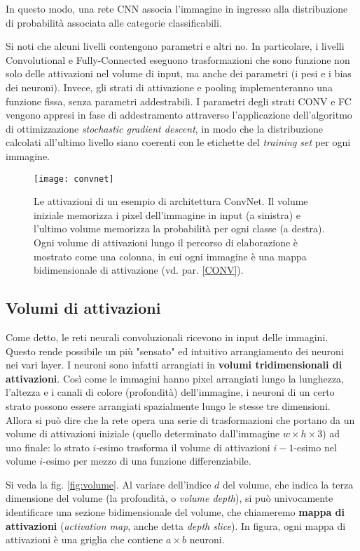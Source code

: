 In questo modo, una rete CNN associa l'immagine in ingresso alla distribuzione di probabilità associata alle categorie classificabili.

Si noti che alcuni livelli contengono parametri e altri no. In particolare, i livelli Convolutional e Fully-Connected eseguono trasformazioni che sono funzione non solo delle attivazioni nel volume di input, ma anche dei parametri (i pesi e i bias dei neuroni). Invece, gli strati di attivazione e pooling implementeranno una funzione fissa, senza parametri addestrabili. I parametri degli strati CONV e FC vengono appresi in fase di addestramento attraverso l'applicazione dell'algoritmo di ottimizzazione \textit{stochastic gradient descent}, in modo che la distribuzione calcolati all'ultimo livello siano coerenti con le etichette del \textit{training set} per ogni immagine.

\begin{figure}[h]
	\centering
	\texttt{[image: convnet]}
	\caption[Esempio di rete CNN]{Le attivazioni di un esempio di architettura ConvNet. Il volume iniziale memorizza i pixel dell'immagine in input (a sinistra) e l'ultimo volume memorizza la probabilità per ogni classe (a destra). Ogni volume di attivazioni lungo il percorso di elaborazione è mostrato come una colonna, in cui ogni immagine è una mappa bidimensionale di attivazione (vd. par. \ref{CONV}).}
	\label{fig:convnet}
\end{figure}

\subsection*{Volumi di attivazioni}
Come detto, le reti neurali convoluzionali ricevono in input delle immagini. Questo rende possibile un più "sensato" ed intuitivo arrangiamento dei neuroni nei vari layer. I neuroni sono infatti arrangiati in \textbf{volumi tridimensionali di attivazioni}. Così come le immagini hanno pixel arrangiati lungo la lunghezza, l'altezza e i canali di colore (profondità) dell'immagine, i neuroni di un certo strato possono essere arrangiati spazialmente lungo le stesse tre dimensioni. Allora si può dire che la rete opera una serie di trasformazioni che portano da un volume di attivazioni iniziale (quello determinato dall'immagine $w\times h\times 3$) ad uno finale: lo strato $i$-esimo trasforma il volume di attivazioni $i-1$-esimo nel volume $i$-esimo per mezzo di una funzione differenziabile.

Si veda la fig. \ref{fig:volume}. Al variare dell'indice $d$ del volume, che indica la terza dimensione del volume (la profondità, o \textit{volume depth}), si può univocamente identificare una sezione bidimensionale del volume, che chiameremo \textbf{mappa di attivazioni} (\textit{activation map}, anche detta \textit{depth slice}). In figura, ogni mappa di attivazioni è una griglia che contiene $a\times b$ neuroni.

